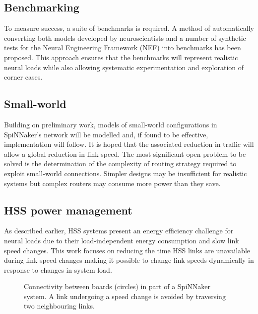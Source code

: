 	\subsection{Benchmarking}
		
		To measure success, a suite of benchmarks is required. A method of
		automatically converting both models developed by neuroscientists and a
		number of synthetic tests for the Neural Engineering Framework (NEF)
		\cite{eliasmith04} into benchmarks has been proposed. This approach ensures
		that the benchmarks will represent realistic neural loads while also
		allowing systematic experimentation and exploration of corner cases.
	
	\subsection{Small-world}
		
		Building on preliminary work, models of small-world configurations in
		SpiNNaker's network will be modelled and, if found to be effective,
		implementation will follow. It is hoped that the associated reduction in
		traffic will allow a global reduction in link speed. The most significant
		open problem to be solved is the determination of the complexity of routing
		strategy required to exploit small-world connections. Simpler designs may be
		insufficient for realistic systems but complex routers may consume more
		power than they save.
	
	\subsection{HSS power management}
		
		As described earlier, HSS systems present an energy efficiency challenge for
		neural loads due to their load-independent energy consumption and slow link
		speed changes. This work focuses on reducing the time HSS links are
		unavailable during link speed changes making it possible to change link
		speeds dynamically in response to changes in system load.
		
		\begin{figure}
			\center
			
			
			\caption{Connectivity between boards (circles) in part of a SpiNNaker
			system. A link undergoing a speed change is avoided by traversing two
			neighbouring links.}
			\label{fig:emergency-routing}
		\end{figure}
		
